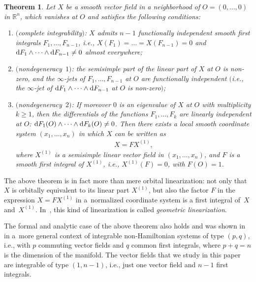 \documentclass[11pt]{article}
\numberwithin{equation}{section}
\newtheorem{thm}{Theorem}[section]
\newcommand{\bbR}{\mathbb R}
\begin{document}
\begin{thm} \label{thm:SmoothLinearization}
Let $X$ be a smooth vector field in a neighborhood of $O = (0,\dots,0)$ in $\bbR^n$,
which vanishes at $O$ and satisfies the following conditions:
\begin{enumerate}\itemsep=0pt
\item[$i)$] $($complete integrability$)$: $X$ admits $n-1$ functionally independent smooth first integrals $F_1,\dots, F_{n-1}$,
i.e., $X(F_1) = \dots = X(F_{n-1}) = 0$ and ${\rm d}F_1 \wedge \dots \wedge {\rm d}F_{n-1} \neq 0$ almost everywhere;
\item[$ii)$] $($nondegeneracy~$1)$: the semisimple part of the linear part of $X$ at $O$ is non-zero, and the $\infty$-jets
of $F_1,\dots,F_{n-1}$ at $O$ are functionally independent $($i.e.,
the $\infty$-jet of ${\rm d}F_1 \wedge \dots \wedge {\rm d}F_{n-1}$ at $O$ is non-zero$)$;
\item[$iii)$] $($nondegeneracy~$2)$: If moreover $0$ is an eigenvalue of $X$ at $O$ with multiplicity $k \geq 1$,
then the differentials of the functions $F_1,\dots, F_k$ are linearly independent at $O$:
 ${\rm d}F_1(O) \wedge \dots \wedge {\rm d}F_k(O) \neq 0$. Then there exists a local smooth coordinate system $(x_1,\dots,x_n)$ in which $X$ can be written as
\begin{gather*}
X = F X^{(1)},
\end{gather*}
where $X^{(1)}$ is a semisimple linear vector field in $(x_1,\dots,x_n)$, and $F$ is a smooth first integral of $X^{(1)}$, i.e., $X^{(1)}(F) = 0$, with $F(O)=1$.
\end{enumerate}
\end{thm}

The above theorem is in fact more than mere orbital linearization: not only that $X$ is orbitally equivalent to its linear part
$X^{(1)}$, but also the factor $F$ in the expression $X = FX^{(1)}$ in a~normalized coordinate system is a
f\/irst integral of~$X$ and~$X^{(1)}$. In~\cite{Zung-Nondegenerate2015}, this kind of linearization is called
\textit{geometric linearization}.

The formal and analytic case of the above theorem also holds and was shown in \cite{Zung-Nondegenerate2015}
in a~more general context of integrable non-Hamiltonian systems of type $(p,q)$, i.e., with $p$ commuting
vector f\/ields and $q$ common f\/irst integrals, where $p+q = n$ is the dimension of the manifold. The vector f\/ields
that we study in this paper are integrable of type $(1,n-1)$, i.e., just one vector f\/ield and $n-1$ f\/irst integrals.
\end{document}
